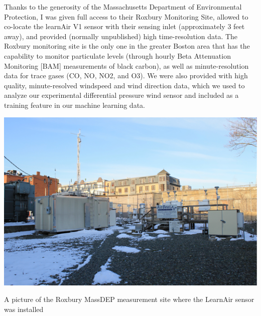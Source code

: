 Thanks to the generosity of the Massachusetts Department of Environmental Protection, I was given full access to their Roxbury Monitoring Site, allowed to co-locate the learnAir V1 sensor with their sensing inlet (approximately 3 feet away), and provided (normally unpublished) high time-resolution data.  The Roxbury monitoring site is the only one in the greater Boston area that has the capability to monitor particulate levels (through hourly Beta Attenuation Monitoring [BAM] measurements of black carbon), as well as minute-resolution data for trace gases (CO, NO, NO2, and O3).  We were also provided with high quality, minute-resolved windspeed and wind direction data, which we used to analyze our experimental differential pressure wind sensor and included as a training feature in our machine learning data.      

\begin{marginfigure}[3.5cm]
 	\includegraphics[width=\textwidth]{visuals/epa}               
 	 \caption{A picture of the Roxbury MassDEP measurement site where the LearnAir sensor was installed}
  	\label{fig:epa}
\end{marginfigure}

